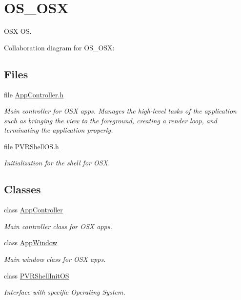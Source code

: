 \hypertarget{group___o_s___o_s_x}{\section{O\+S\+\_\+\+O\+S\+X}
\label{group___o_s___o_s_x}
}


O\+S\+X O\+S.  


Collaboration diagram for O\+S\+\_\+\+O\+S\+X\+:
\subsection*{Files}
\begin{DoxyCompactItemize}
\item 
file \hyperlink{_o_s_x_2_app_controller_8h}{App\+Controller.\+h}
\begin{DoxyCompactList}\small\item\em Main controller for O\+S\+X apps. Manages the high-\/level tasks of the application such as bringing the view to the foreground, creating a render loop, and terminating the application properly. \end{DoxyCompactList}\item 
file \hyperlink{_o_s_x_2_p_v_r_shell_o_s_8h}{P\+V\+R\+Shell\+O\+S.\+h}
\begin{DoxyCompactList}\small\item\em Initialization for the shell for O\+S\+X. \end{DoxyCompactList}\end{DoxyCompactItemize}
\subsection*{Classes}
\begin{DoxyCompactItemize}
\item 
class \hyperlink{interface_app_controller}{App\+Controller}
\begin{DoxyCompactList}\small\item\em Main controller class for O\+S\+X apps. \end{DoxyCompactList}\item 
class \hyperlink{interface_app_window}{App\+Window}
\begin{DoxyCompactList}\small\item\em Main window class for O\+S\+X apps. \end{DoxyCompactList}\item 
class \hyperlink{class_p_v_r_shell_init_o_s}{P\+V\+R\+Shell\+Init\+O\+S}
\begin{DoxyCompactList}\small\item\em Interface with specific Operating System. \end{DoxyCompactList}\end{DoxyCompactItemize}
